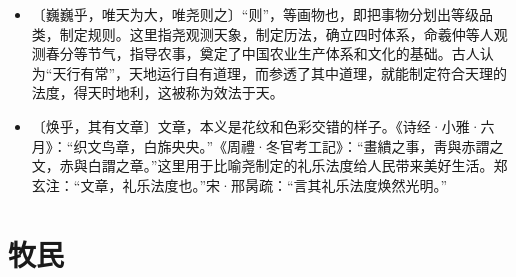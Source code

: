 \documentclass[12pt,UTF-8,openany,a4]{ctexbook}
\begin{document}
\begin{itemize}
    \item〔巍巍乎，唯天为大，唯尧则之〕{\yiwen “则”，等画物也，即把事物分划出等级品类，制定规则。这里指尧观测天象，制定历法，确立四时体系，命羲仲等人观测春分等节气，指导农事，奠定了中国农业生产体系和文化的基础。古人认为“天行有常”，天地运行自有道理，而参透了其中道理，就能制定符合天理的法度，得天时地利，这被称为效法于天。}
    \item〔焕乎，其有文章〕{\yiwen 文章，本义是花纹和色彩交错的样子。《诗经·小雅·六月》：“织文鸟章，白旆央央。”《周禮·冬官考工記》：“畫繢之事，靑與赤謂之文，赤與白謂之章。”这里用于比喻尧制定的礼乐法度给人民带来美好生活。郑玄注：“文章，礼乐法度也。”宋·邢昺疏：“言其礼乐法度焕然光明。”}
\end{itemize}

\chapter{牧民}
\end{document}
